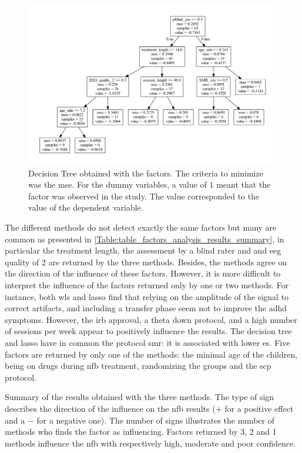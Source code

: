 \begin{figure}[h!]
  \centering
  \includegraphics[width=1.0\linewidth]{figures/factors_analysis_decision_tree_results_no_colors_2-columns_fitting_image}
  \caption{Decision Tree obtained with the factors. The criteria to minimize was the \gls{mse}. For the dummy variables, a value of $1$ meant
	that the factor was observed in the study. The value corresponded to the value of the dependent variable.}
  \label{Figure:factors_analysis_decision_tree_results}
\end{figure}

The different methods do not detect exactly the same factors but many are common as presented in \cref{Table:table_factors_analysis_results_summary},
 in particular the treatment length, the assessment by a blind rater and and \gls{eeg} quality of 2 are returned by the three methods. Besides, 
the methods agree on the direction of the influence of these factors. However, it is more difficult to interpret the influence of the factors 
returned only by one or two methods. For instance, both \gls{wls} and \gls{lasso} find that  
relying on the amplitude of the signal to correct artifacts, and including a transfer phase seem not to improve the \gls{adhd} symptoms. 
However, the \gls{irb} approval, a theta down protocol, and a high number of sessions per week appear to 
positively influence the results. The decision tree and \gls{lasso} have in common the protocol \gls{smr}: it is associated with lower \gls{es}.
Five factors are returned by only one of the methods: the minimal age of the children, being on drugs 
during \gls{nfb} treatment, randomizing the groups and the \gls{scp} protocol.  

\begin{table}[h!]
  \centering
  \caption{Summary of the results obtained with the three methods. The type of sign describes the direction of the influence on the \gls{nfb} 
	results ($+$ for a positive effect and a $-$ for a negative one). The number of signs illustrates the number of methods who finds the factor 
	as influencing. Factors returned by 3, 2 and 1 methods influence the \gls{nfb} with respectively high, moderate and poor confidence.}
  
  \label{Table:table_factors_analysis_results_summary}
\end{table}

